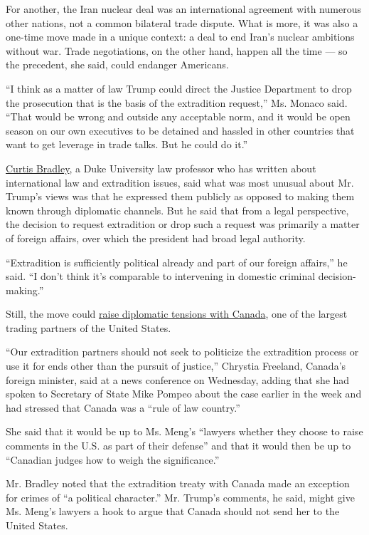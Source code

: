 For another, the Iran nuclear deal was an international agreement with
numerous other nations, not a common bilateral trade dispute. What is
more, it was also a one-time move made in a unique context: a deal to
end Iran's nuclear ambitions without war. Trade negotiations, on the
other hand, happen all the time --- so the precedent, she said, could
endanger Americans.

``I think as a matter of law Trump could direct the Justice Department
to drop the prosecution that is the basis of the extradition request,''
Ms. Monaco said. ``That would be wrong and outside any acceptable norm,
and it would be open season on our own executives to be detained and
hassled in other countries that want to get leverage in trade talks. But
he could do it.''

\href{https://law.duke.edu/fac/bradleyc/}{Curtis Bradley}, a Duke
University law professor who has written about international law and
extradition issues, said what was most unusual about Mr. Trump's views
was that he expressed them publicly as opposed to making them known
through diplomatic channels. But he said that from a legal perspective,
the decision to request extradition or drop such a request was primarily
a matter of foreign affairs, over which the president had broad legal
authority.

``Extradition is sufficiently political already and part of our foreign
affairs,'' he said. ``I don't think it's comparable to intervening in
domestic criminal decision-making.''

Still, the move could
\href{https://www.nytimes.com/2018/12/12/world/canada/canada-china-meng-huawei.html}{raise
diplomatic tensions with Canada}, one of the largest trading partners of
the United States.

``Our extradition partners should not seek to politicize the extradition
process or use it for ends other than the pursuit of justice,'' Chrystia
Freeland, Canada's foreign minister, said at a news conference on
Wednesday, adding that she had spoken to Secretary of State Mike Pompeo
about the case earlier in the week and had stressed that Canada was a
``rule of law country.''

She said that it would be up to Ms. Meng's ``lawyers whether they choose
to raise comments in the U.S. as part of their defense'' and that it
would then be up to ``Canadian judges how to weigh the significance.''

Mr. Bradley noted that the extradition treaty with Canada made an
exception for crimes of ``a political character.'' Mr. Trump's comments,
he said, might give Ms. Meng's lawyers a hook to argue that Canada
should not send her to the United States.


